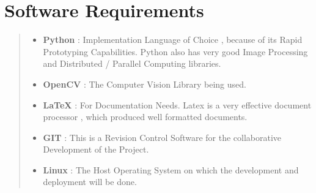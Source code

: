 \section*{Software Requirements}
\begin{quote}
\begin{itemize}
\item \textbf{Python} : Implementation Language of Choice , because of its Rapid Prototyping Capabilities. Python also has very good Image Processing and Distributed / Parallel Computing libraries.
\item \textbf{OpenCV} : The Computer Vision Library being used.
\item \textbf{LaTeX} : For Documentation Needs. Latex is a very effective document processor , which produced well formatted documents. 
\item \textbf{GIT} : This is a Revision Control Software for the collaborative Development of the Project.
\item \textbf{Linux} : The Host Operating System on which the development and deployment will be done.
\end{itemize}
\end{quote}

